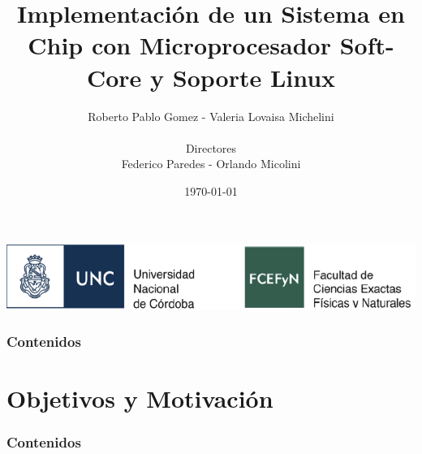 \documentclass[xcolor=dvipsnames,mathserif,9pt]{beamer}
\author[V. Lovaisa Michelini]{Roberto Pablo Gomez - Valeria Lovaisa Michelini \\ \ \\  Directores \\ Federico Paredes - Orlando Micolini}
\title[\hspace{2cm}\insertframenumber/\inserttotalframenumber]{\large
  Implementación de un Sistema en Chip con Microprocesador
Soft-Core y Soporte Linux\\
}
\date{\today} %
\begin{document}
\begin{frame}
  \begin{center}
  \titlepage
  \vspace{0.75cm} 
  \hspace{20mm}
  \includegraphics[height=0.095\textheight]{figuras/logonuevo}
  \scriptsize
  \end{center}
\end{frame}



\begin{frame}
  \frametitle{Contenidos}
  \tableofcontents
\end{frame}

%  
%  
  \section{Objetivos y Motivación}

 
\begin{frame}
   \frametitle{Contenidos}
   \tableofcontents[currentsection]
 \end{frame}
  
\end{document}

